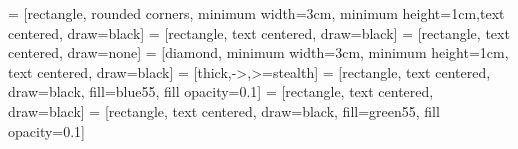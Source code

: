 \newcommand{\myName}{Paul Glaser}
\newcommand{\ThesisTitle}{Zuverlässigkeitsuntersuchung elektrischer Traktionsmotoren}
\newcommand{\ThesisTitleShort}{Untersuchung el. Traktionsmotoren}
\newcommand{\ThesisDegree}{Bachelor of Engineering (B. Eng.)} 
\newcommand{\myStudentId}{1346190}
\newcommand{\Supervisor}{Prof. Dr.-Ing. Thomas Hollstein}
\newcommand{\CoSupervisor}{??}
\newcommand{\CompSupervisor}{M.Sc. Timo Petri}
\newcommand{\Faculty}{Faculty of Computer Science and Engineering}
\newcommand{\University}{Frankfurt University of Applied Sciences}
\newcommand{\UniversityLocation}{Frankfurt}
\newcommand{\ThesisDeliveryDate}{14. Dezember 2024 ??}
\newcommand{\CompanyName}{Robert Bosch GmbH}  %

\newcommand{\VarPicWidthA}{\textwidth}
\newcommand{\VarPicWidthB}{0.9\textwidth}
\newcommand{\VarPicWidthC}{0.8\textwidth}
\newcommand{\VarPicWidthD}{0.7\textwidth}
\newcommand{\VarPicWidthE}{0.6\textwidth}
\newcommand{\VarPicWidthF}{0.49\textwidth}
\newcommand{\VarPicWidthG}{0.32\textwidth}
\newcommand{\VarPicWidthH}{0.24\textwidth}


\newcommand{\ti}[1]{_\mathrm{#1}}
\newcommand\tab[1][1cm]{\hspace*{#1}}

 = [rectangle, rounded corners, minimum width=3cm, minimum height=1cm,text centered, draw=black]
 = [rectangle, text centered, draw=black]
 = [rectangle, text centered, draw=none]
 = [diamond, minimum width=3cm, minimum height=1cm, text centered, draw=black]
 = [thick,->,>=stealth]
 = [rectangle, text centered, draw=black, fill=blue55, fill opacity=0.1]
 = [rectangle, text centered, draw=black]
 = [rectangle, text centered, draw=black, fill=green55, fill opacity=0.1]





